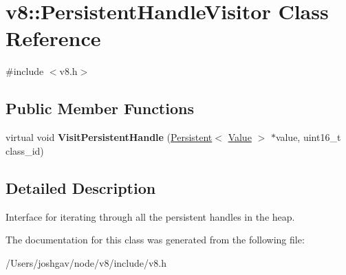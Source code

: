 \hypertarget{classv8_1_1_persistent_handle_visitor}{}\section{v8\+:\+:Persistent\+Handle\+Visitor Class Reference}
\label{classv8_1_1_persistent_handle_visitor}


{\ttfamily \#include $<$v8.\+h$>$}

\subsection*{Public Member Functions}
\begin{DoxyCompactItemize}
\item 
virtual void {\bfseries Visit\+Persistent\+Handle} (\hyperlink{classv8_1_1_persistent}{Persistent}$<$ \hyperlink{classv8_1_1_value}{Value} $>$ $\ast$value, uint16\+\_\+t class\+\_\+id)\hypertarget{classv8_1_1_persistent_handle_visitor_a092c6cc7700b38d9c60bd693a071045a}{}\label{classv8_1_1_persistent_handle_visitor_a092c6cc7700b38d9c60bd693a071045a}

\end{DoxyCompactItemize}


\subsection{Detailed Description}
Interface for iterating through all the persistent handles in the heap. 

The documentation for this class was generated from the following file\+:\begin{DoxyCompactItemize}
\item 
/\+Users/joshgav/node/v8/include/v8.\+h\end{DoxyCompactItemize}
